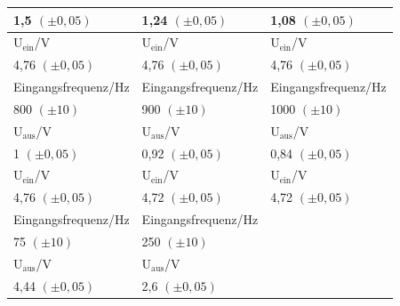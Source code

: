 \documentclass[12pt]{scrartcl}
\begin{document}
\begin{table}[H]
\begin{center}
\begin{tabular}{|l|l|l|}
1,5 $(\pm 0,05)$ & 1,24 $(\pm 0,05)$ & 1,08 $(\pm 0,05)$ \\ \hline
U$_\text{ein}$/V & U$_\text{ein}$/V & U$_\text{ein}$/V \\ \hline
4,76 $(\pm 0,05)$ & 4,76 $(\pm 0,05)$ & 4,76 $(\pm 0,05)$ \\ \hline \hline
Eingangsfrequenz/Hz & Eingangsfrequenz/Hz & Eingangsfrequenz/Hz \\ \hline
800 $(\pm 10)$ & 900 $(\pm 10)$ & 1000 $(\pm 10)$ \\ \hline
U$_\text{aus}$/V & U$_\text{aus}$/V & U$_\text{aus}$/V \\ \hline
1 $(\pm 0,05)$ & 0,92 $(\pm 0,05)$ & 0,84 $(\pm 0,05)$ \\ \hline
U$_\text{ein}$/V & U$_\text{ein}$/V & U$_\text{ein}$/V \\ \hline
4,76 $(\pm 0,05)$ & 4,72 $(\pm 0,05)$ & 4,72 $(\pm 0,05)$ \\ \hline \hline
Eingangsfrequenz/Hz & Eingangsfrequenz/Hz &  \\ \hline
75 $(\pm 10)$ & 250 $(\pm 10)$ &  \\ \hline
U$_\text{aus}$/V & U$_\text{aus}$/V &  \\ \hline
4,44 $(\pm 0,05)$ & 2,6 $(\pm 0,05)$ &  \\ \hline
\end{tabular}
\end{center}
\label{tab:2.3.1}
\end{table}
\end{document}
